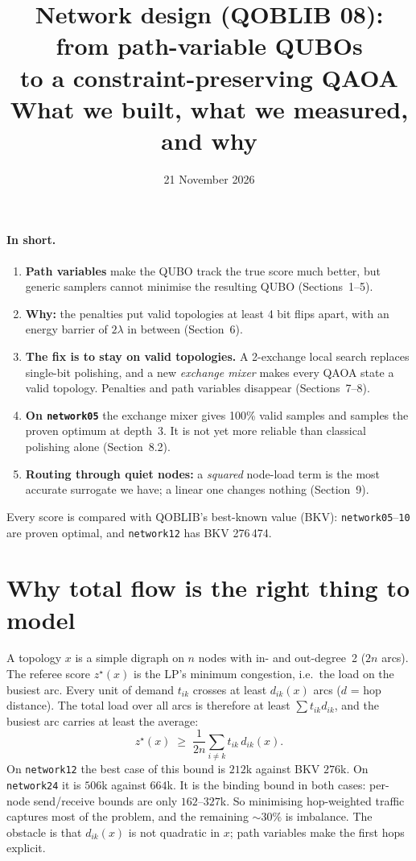 \documentclass[11pt]{article}
\title{\textbf{Network design (QOBLIB 08): from path-variable QUBOs\\ to a constraint-preserving QAOA}\\[2pt]
\large What we built, what we measured, and why}
\date{21 November 2026}
\author{}
\begin{document}
\maketitle
\vspace{-1.2cm}

\paragraph{In short.}
\begin{enumerate}
\item \textbf{Path variables} make the QUBO track the true score much better, but generic
  samplers cannot minimise the resulting QUBO (Sections~1--5).
\item \textbf{Why:} the penalties put valid topologies at least 4 bit flips apart, with an
  energy barrier of $2\lambda$ in between (Section~6).
\item \textbf{The fix is to stay on valid topologies.} A 2-exchange local search
  replaces single-bit polishing, and a new \emph{exchange mixer} makes every QAOA state a
  valid topology. Penalties and path variables disappear (Sections~7--8).
\item \textbf{On \texttt{network05}} the exchange mixer gives 100\% valid samples and
  samples the proven optimum at depth~3. It is not yet more reliable than classical
  polishing alone (Section~8.2).
\item \textbf{Routing through quiet nodes:} a \emph{squared} node-load term is the most
  accurate surrogate we have; a linear one changes nothing (Section~9).
\end{enumerate}
Every score is compared with QOBLIB's best-known value (BKV): \texttt{network05}--\texttt{10}
are proven optimal, and \texttt{network12} has BKV 276\,474.

\section{Why total flow is the right thing to model}
A topology $x$ is a simple digraph on $n$ nodes with in- and out-degree~2 ($2n$ arcs). The
referee score $z^\star(x)$ is the LP's minimum congestion, i.e.\ the load on the busiest arc.
Every unit of demand $t_{ik}$ crosses at least $d_{ik}(x)$ arcs ($d$ = hop distance). The
total load over all arcs is therefore at least $\sum t_{ik} d_{ik}$, and the busiest arc
carries at least the average:
\begin{equation}
  z^\star(x)\;\ge\;\frac{1}{2n}\sum_{i\neq k} t_{ik}\, d_{ik}(x).
  \label{eq:bound}
\end{equation}
On \texttt{network12} the best case of this bound is $212$k against BKV $276$k. On
\texttt{network24} it is $506$k against $664$k. It is the binding bound in both cases:
per-node send/receive bounds are only $162$--$327$k. So minimising hop-weighted traffic
captures most of the problem, and the remaining ${\sim}30\%$ is imbalance. The obstacle is
that $d_{ik}(x)$ is not quadratic in $x$; path variables make the first hops explicit.
\end{document}
